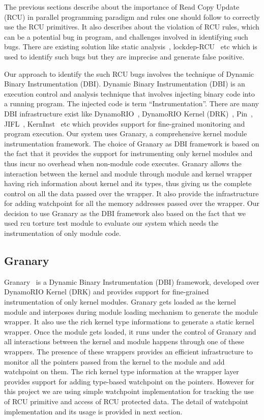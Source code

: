 The previous sections describe about the importance of Read Copy Update (RCU) in parallel programming paradigm and rules one should follow to correctly use the RCU primitives. It also describes about the violation of RCU rules, which can be a potential bug in program, and challenges involved in identifying such bugs. There are existing solution like static analysis~\cite{sparse}, lockdep-RCU~\cite{PaulEMcKenney2010LockdepRCU} etc which is used to identify such bugs but they are imprecise and generate false positive.

Our approach to identify the such RCU bugs involves the technique of Dynamic Binary Instrumentation (DBI). Dynamic Binary Instrumentation (DBI) is an execution control and analysis technique that involves injecting binary code into a running program. The injected code is term “Instrumentation”. There are many DBI infrastructure exist like DynamoRIO~\cite{Bruening04efficient}, DynamoRIO Kernel (DRK)~\cite{Feiner:2012:CKI:2150976.2150992},  Pin~\cite{Bungale:2007:PPF:1254810.1254830}, JIFL~\cite{Olszewski:2007:JIN:1272996.1273000}, KernInst~\cite{Tamches:1999:UDK:1080598.1080605} etc which provides support for fine-grained monitoring and program execution. Our system uses Granary, a comprehensive kernel module instrumentation framework. The choice of Granary as DBI framework is based on the fact that it provides the support for instrumenting only kernel modules and thus incur no overhead when non-module code executes. Granary allows the interaction between the kernel and module through module and kernel wrapper having rich information about kernel and its types, thus giving us the complete control on all the data passed over the wrapper. It also provide the infrastructure for adding watchpoint for all the memory addresses passed over the wrapper. Our decision to use Granary as the DBI framework also based on the fact that we used rcu torture test module to evaluate our system which needs the instrumentation of only module code. 


\subsection{Granary}
Granary~\cite{GranaryAtOSDI} is a Dynamic Binary Instrumentation (DBI) framework, developed over DynamoRIO Kernel (DRK) and provides support for fine-grained instrumentation of only kernel modules. Granary gets loaded as the kernel module and interposes during module loading mechanism to generate the module wrapper. It also use the rich kernel type informations to generate a static kernel wrapper. Once the module gets loaded, it runs under the control of Granary and all interactions between the kernel and module happens through one of these wrappers. The presence of these wrappers provides an efficient infrastructure to monitor all the pointers passed from the kernel to the module and add watchpoint on them. The rich kernel type information at the wrapper layer provides support for adding type-based watchpoint on the pointers. However for this project we are using simple watchpoint implementation for tracking the use of RCU primitive and access of RCU protected data. The detail of watchpoint implementation and its usage is provided in next section. 


